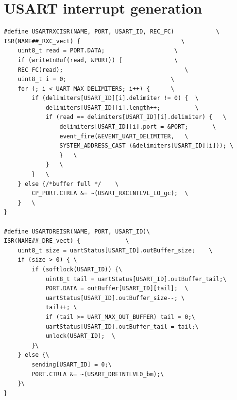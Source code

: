 \documentclass{report}
\begin{document}
\chapter{USART interrupt generation}
\label{append:usartinterruptgen}
\begin{verbatim}
#define USARTRXCISR(NAME, PORT, USART_ID, REC_FC)            \
ISR(NAME##_RXC_vect) {                             \
	uint8_t read = PORT.DATA;                    \
	if (writeInBuf(read, &PORT)) {               \
	REC_FC(read);                                   \
	uint8_t i = 0;                              \
	for (; i < UART_MAX_DELIMITERS; i++) {      \
		if (delimiters[USART_ID][i].delimiter != 0) {  \
			delimiters[USART_ID][i].length++;          \
			if (read == delimiters[USART_ID][i].delimiter) {   \
				delimiters[USART_ID][i].port = &PORT;       \
				event_fire(&EVENT_UART_DELIMITER,	\
				SYSTEM_ADDRESS_CAST (&delimiters[USART_ID][i])); \
				}   \
			}   \
		}   \
	} else {/*buffer full */    \
		CP_PORT.CTRLA &= ~(USART_RXCINTLVL_LO_gc);  \
	}   \
}

#define USARTDREISR(NAME, PORT, USART_ID)\
ISR(NAME##_DRE_vect) {             \
	uint8_t size = uartStatus[USART_ID].outBuffer_size;    \
	if (size > 0) { \
		if (softlock(USART_ID)) {\
			uint8_t tail = uartStatus[USART_ID].outBuffer_tail;\
			PORT.DATA = outBuffer[USART_ID][tail];  \
			uartStatus[USART_ID].outBuffer_size--; \
			tail++; \
			if (tail >= UART_MAX_OUT_BUFFER) tail = 0;\
			uartStatus[USART_ID].outBuffer_tail = tail;\
			unlock(USART_ID);  \
		}\
	} else {\
		sending[USART_ID] = 0;\
		PORT.CTRLA &= ~(USART_DREINTLVL0_bm);\
	}\
}
\end{verbatim}
\end{document}
